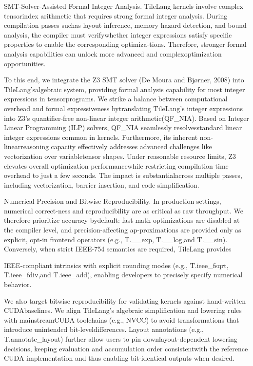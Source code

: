 \documentclass[
  10
]{article}
\begin{document}
SMT-Solver-Assisted Formal Integer Analysis. TileLang kernels involve
complex tensorindex arithmetic that requires strong formal integer
analysis. During compilation passes suchas layout inference, memory
hazard detection, and bound analysis, the compiler must verifywhether
integer expressions satisfy specific properties to enable the
corresponding optimiza-tions. Therefore, stronger formal analysis
capabilities can unlock more advanced and complexoptimization
opportunities.

To this end, we integrate the Z3 SMT solver (De Moura and Bjørner, 2008)
into TileLang'salgebraic system, providing formal analysis capability
for most integer expressions in tensorprograms. We strike a balance
between computational overhead and formal expressiveness bytranslating
TileLang's integer expressions into Z3's quantifier-free non-linear
integer arithmetic(QF\_NIA). Based on Integer Linear Programming (ILP)
solvers, QF\_NIA seamlessly resolvesstandard linear integer expressions
common in kernels. Furthermore, its inherent non-linearreasoning
capacity effectively addresses advanced challenges like vectorization
over variabletensor shapes. Under reasonable resource limits, Z3
elevates overall optimization performancewhile restricting compilation
time overhead to just a few seconds. The impact is substantialacross
multiple passes, including vectorization, barrier insertion, and code
simplification.

Numerical Precision and Bitwise Reproducibility. In production settings,
numerical correct-ness and reproducibility are as critical as raw
throughput. We therefore prioritize accuracy bydefault: fast-math
optimizations are disabled at the compiler level, and
precision-affecting ap-proximations are provided only as explicit,
opt-in frontend operators (e.g., T.\_\_exp, T.\_\_log,and T.\_\_sin).
Conversely, when strict IEEE-754 semantics are required, TileLang
provides

IEEE-compliant intrinsics with explicit rounding modes (e.g.,
T.ieee\_fsqrt, T.ieee\_fdiv,and T.ieee\_add), enabling developers to
precisely specify numerical behavior.

We also target bitwise reproducibility for validating kernels against
hand-written CUDAbaselines. We align TileLang's algebraic simplification
and lowering rules with mainstreamCUDA toolchains (e.g., NVCC) to avoid
transformations that introduce unintended bit-leveldifferences. Layout
annotations (e.g., T.annotate\_layout) further allow users to pin
downlayout-dependent lowering decisions, keeping evaluation and
accumulation order consistentwith the reference CUDA implementation and
thus enabling bit-identical outputs when desired.
\end{document}
